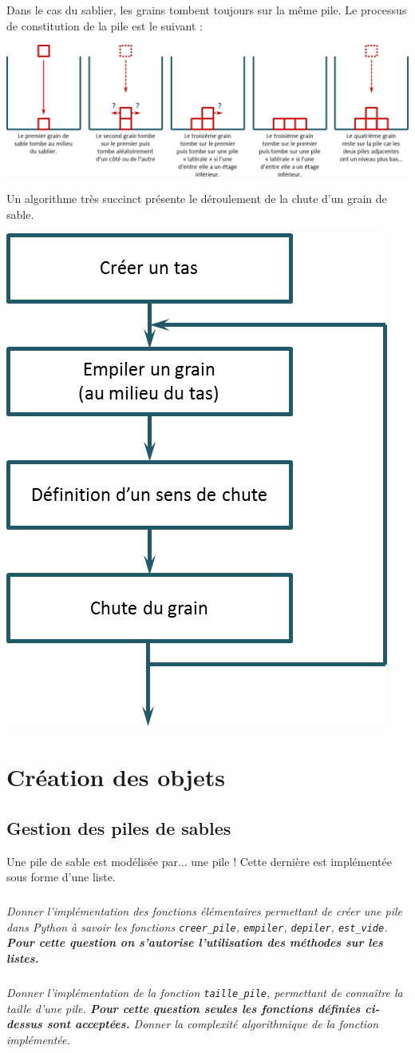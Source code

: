 \documentclass[10pt,fleqn]{article} %
\begin{document}
\begin{multicols}{2}
Dans le cas du sablier, les grains tombent toujours sur la même pile. Le processus de constitution de la pile est le suivant : 
\begin{center}
\includegraphics[width=\linewidth]{images/sablier_02}
\end{center}
Un algorithme très succinct présente le déroulement de la chute d'un grain de sable.
\begin{center}
\includegraphics[width=.4\linewidth]{images/algo}
\end{center}
\section*{Création des objets}
\subsection*{Gestion des piles de sables}
Une pile de sable est modélisée par... une pile ! Cette dernière est implémentée sous forme d'une liste. 

\subparagraph{}
\textit{Donner l'implémentation des fonctions élémentaires permettant de créer une pile dans Python à savoir les fonctions \texttt{creer\_pile}, \texttt{empiler}, \texttt{depiler}, \texttt{est\_vide}. \textbf{Pour cette question on s'autorise l'utilisation des méthodes sur les listes.}}

\subparagraph{}
\textit{Donner l'implémentation de la fonction \texttt{taille\_pile}, permettant de connaître la taille d'une pile. \textbf{Pour cette question seules les fonctions définies ci-dessus sont acceptées.} Donner la complexité algorithmique de la fonction implémentée.}


\end{multicols}
\end{document}
